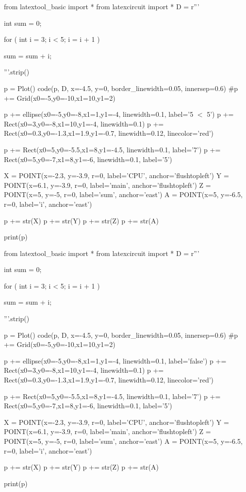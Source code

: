 \begin{python}
from latextool_basic import *
from latexcircuit import *
D = r'''



int sum = 0;

    for ( int i = 3;     i < 5;     i = i + 1 )


        sum = sum + i;



'''.strip()

p = Plot()
code(p, D, x=-4.5, y=0, border_linewidth=0.05, innersep=0.6)
#p += Grid(x0=-5,y0=-10,x1=10,y1=2)

p += ellipse(x0=-5,y0=-8,x1=1,y1=-4, linewidth=0.1, label='5 $<$ 5')
p += Rect(x0=3,y0=-8,x1=10,y1=-4, linewidth=0.1)
p += Rect(x0=0.3,y0=-1.3,x1=1.9,y1=-0.7, linewidth=0.12, linecolor='red')

p += Rect(x0=5,y0=-5.5,x1=8,y1=-4.5, linewidth=0.1, label='7')
p += Rect(x0=5,y0=-7,x1=8,y1=-6, linewidth=0.1, label='5')

X = POINT(x=-2.3, y=-3.9, r=0, label='CPU', anchor='flushtopleft')
Y = POINT(x=6.1, y=-3.9, r=0, label='main', anchor='flushtopleft')
Z = POINT(x=5, y=-5, r=0, label='sum', anchor='east')
A = POINT(x=5, y=-6.5, r=0, label='i', anchor='east')

p += str(X)
p += str(Y)
p += str(Z)
p += str(A)

print(p)
\end{python}

\begin{python}
from latextool_basic import *
from latexcircuit import *
D = r'''



int sum = 0;

    for ( int i = 3;     i < 5;     i = i + 1 )


        sum = sum + i;



'''.strip()

p = Plot()
code(p, D, x=-4.5, y=0, border_linewidth=0.05, innersep=0.6)
#p += Grid(x0=-5,y0=-10,x1=10,y1=2)

p += ellipse(x0=-5,y0=-8,x1=1,y1=-4, linewidth=0.1, label='false')
p += Rect(x0=3,y0=-8,x1=10,y1=-4, linewidth=0.1)
p += Rect(x0=0.3,y0=-1.3,x1=1.9,y1=-0.7, linewidth=0.12, linecolor='red')

p += Rect(x0=5,y0=-5.5,x1=8,y1=-4.5, linewidth=0.1, label='7')
p += Rect(x0=5,y0=-7,x1=8,y1=-6, linewidth=0.1, label='5')

X = POINT(x=-2.3, y=-3.9, r=0, label='CPU', anchor='flushtopleft')
Y = POINT(x=6.1, y=-3.9, r=0, label='main', anchor='flushtopleft')
Z = POINT(x=5, y=-5, r=0, label='sum', anchor='east')
A = POINT(x=5, y=-6.5, r=0, label='i', anchor='east')

p += str(X)
p += str(Y)
p += str(Z)
p += str(A)

print(p)
\end{python}

